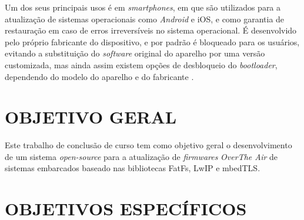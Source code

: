 Um dos seus principais usos é em \textit{smartphones}, em que são utilizados para a atualização de sistemas operacionais como \textit{Android} e iOS, e como garantia de restauração em caso de erros irreversíveis no sistema operacional. É desenvolvido pelo próprio fabricante do dispositivo, e por padrão é bloqueado para os usuários, evitando a substituição do \textit{software} original do aparelho por uma versão customizada, mas ainda assim existem opções de desbloqueio do \textit{bootloader}, dependendo do modelo do aparelho e do fabricante \cite{Salute2018}.%





\section{OBJETIVO GERAL}
\label{sec:Objetivo Geral}

Este trabalho de conclusão de curso tem como objetivo geral o desenvolvimento de um sistema \textit{open-source} para a atualização  de \textit{firmwares} \textit{OverThe Air} de sistemas embarcados baseado nas bibliotecas FatFs, LwIP e mbedTLS. 

\section{OBJETIVOS ESPECÍFICOS}
\label{sec:Objetivos Específicos}

